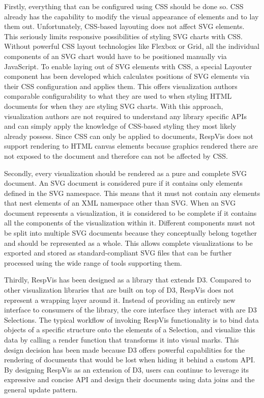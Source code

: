 Firstly, everything that can be configured using CSS should be done so.
CSS already has the capability to modify the visual appearance of elements and to lay them out.
Unfortunately, CSS-based layouting does not affect SVG elements.
This seriously limits responsive possibilities of styling SVG charts with CSS.
Without powerful CSS layout technologies like Flexbox or Grid, all the individual components of an SVG chart would have to be positioned manually via JavaScript.
To enable laying out of SVG elements with CSS, a special Layouter component has been developed which calculates positions of SVG elements via their CSS configuration and applies them.
This offers visualization authors comparable configurability to what they are used to when styling HTML documents for when they are styling SVG charts.
With this approach, visualization authors are not required to understand any library specific APIs and can simply apply the knowledge of CSS-based styling they most likely already possess.
Since CSS can only be applied to documents, RespVis does not support rendering to HTML canvas elements because graphics rendered there are not exposed to the document and therefore can not be affected by CSS.

Secondly, every visualization should be rendered as a pure and complete SVG document.
An SVG document is considered pure if it contains only elements defined in the SVG namespace.
This means that it must not contain any  elements that nest elements of an XML namespace other than SVG.
When an SVG document represents a visualization, it is considered to be complete if it contains all the components of the visualization within it.
Different components must not be split into multiple SVG documents because they conceptually belong together and should be represented as a whole.
This allows complete visualizations to be exported and stored as standard-compliant SVG files that can be further processed using the wide range of tools supporting them.

Thirdly, RespVis has been designed as a library that extends D3.
Compared to other visualization libraries that are built on top of D3, RespVis does not represent a wrapping layer around it. 
Instead of providing an entirely new interface to consumers of the library, the core interface they interact with are D3 Selections.
The typical workflow of invoking RespVis functionality is to bind data objects of a specific structure onto the elements of a Selection, and visualize this data by calling a render function that transforms it into visual marks.
This design decision has been made because D3 offers powerful capabilities for the rendering of documents that would be lost when hiding it behind a custom API.
By designing RespVis as an extension of D3, users can continue to leverage its expressive and concise API and design their documents using data joins and the general update pattern.

